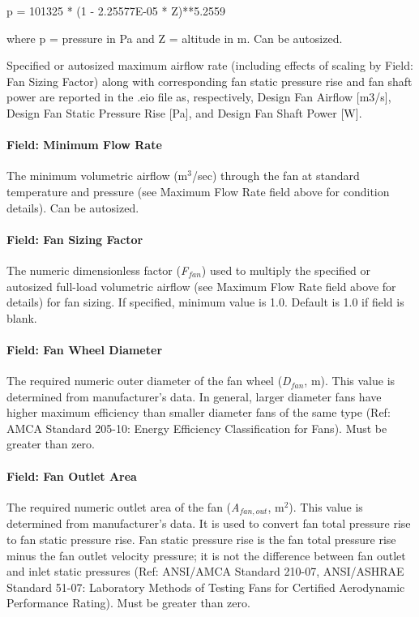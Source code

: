 p = 101325 * (1 - 2.25577E-05 * Z)**5.2559

where p = pressure in Pa and Z = altitude in m. Can be autosized.

Specified or autosized maximum airflow rate (including effects of scaling by Field: Fan Sizing Factor) along with corresponding fan static pressure rise and fan shaft power are reported in the .eio file as, respectively, Design Fan Airflow {[}m3/s{]}, Design Fan Static Pressure Rise {[}Pa{]}, and Design Fan Shaft Power {[}W{]}.

\paragraph{Field: Minimum Flow Rate}\label{field-minimum-flow-rate}

The minimum volumetric airflow (m\(^{3}\)/sec) through the fan at standard temperature and pressure (see Maximum Flow Rate field above for condition details). Can be autosized.

\paragraph{Field: Fan Sizing Factor}\label{field-fan-sizing-factor}

The numeric dimensionless factor (\emph{F\(_{fan}\)}) used to multiply the specified or autosized full-load volumetric airflow (see Maximum Flow Rate field above for details) for fan sizing. If specified, minimum value is 1.0. Default is 1.0 if field is blank.

\paragraph{Field: Fan Wheel Diameter}\label{field-fan-wheel-diameter}

The required numeric outer diameter of the fan wheel (\emph{D\(_{fan}\)}, m). This value is determined from manufacturer's data. In general, larger diameter fans have higher maximum efficiency than smaller diameter fans of the same type (Ref: AMCA Standard 205-10: Energy Efficiency Classification for Fans). Must be greater than zero.

\paragraph{Field: Fan Outlet Area}\label{field-fan-outlet-area}

The required numeric outlet area of the fan (\emph{A\(_{fan,out}\)}, m\(^{2}\)). This value is determined from manufacturer's data. It is used to convert fan total pressure rise to fan static pressure rise. Fan static pressure rise is the fan total pressure rise minus the fan outlet velocity pressure; it is not the difference between fan outlet and inlet static pressures (Ref: ANSI/AMCA Standard 210-07, ANSI/ASHRAE Standard 51-07: Laboratory Methods of Testing Fans for Certified Aerodynamic Performance Rating). Must be greater than zero.

